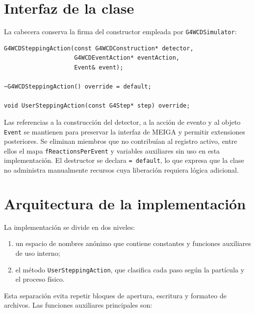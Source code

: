 \documentclass[11pt,a4paper]{article}
\newcommand{\codigo}[1]{\nolinkurl{#1}}
\begin{document}
\section{Interfaz de la clase}

La cabecera conserva la firma del constructor empleada por \codigo{G4WCDSimulator}:

\begin{lstlisting}
G4WCDSteppingAction(const G4WCDConstruction* detector,
                    G4WCDEventAction* eventAction,
                    Event& event);

~G4WCDSteppingAction() override = default;

void UserSteppingAction(const G4Step* step) override;
\end{lstlisting}

Las referencias a la construcción del detector, a la acción de evento y al
objeto \codigo{Event} se mantienen para preservar la interfaz de MEIGA y permitir
extensiones posteriores. Se eliminan miembros que no contribuían al registro
activo, entre ellos el mapa \codigo{fReactionsPerEvent} y variables auxiliares
sin uso en esta implementación. El destructor se declara
\codigo{= default}, lo que expresa que la clase no administra manualmente
recursos cuya liberación requiera lógica adicional.

\section{Arquitectura de la implementación}

La implementación se divide en dos niveles:

\begin{enumerate}
  \item un espacio de nombres anónimo que contiene constantes y funciones
  auxiliares de uso interno;
  \item el método \codigo{UserSteppingAction}, que clasifica cada paso según la
  partícula y el proceso físico.
\end{enumerate}

Esta separación evita repetir bloques de apertura, escritura y formateo de
archivos. Las funciones auxiliares principales son:
\end{document}
